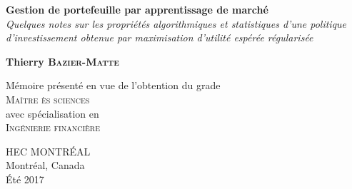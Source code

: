 \begin{titlepage}
  \begin{center}
    \vspace*{1cm}
    
    \textbf{Gestion de portefeuille par apprentissage de marché}
    \\[0.7cm]
    \textit{Quelques notes sur les propriétés algorithmiques et statistiques d'une
      politique d'investissement obtenue par maximisation d'utilité espérée régularisée}
    
    \vfill
    \textbf{Thierry \textsc{Bazier-Matte}}
    \vfill
        
    Mémoire présenté en vue de l'obtention du grade
    \\[0.2cm]
    \textsc{Maître ès sciences}
    \\[0.2cm]
    avec spécialisation en\\
    \textsc{Ingénierie financière}

    \vfill

    HEC MONTRÉAL\\
    Montréal, Canada\\
    Été 2017
  \end{center}
\end{titlepage}

